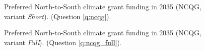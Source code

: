 \begin{figure}[h!]
    \caption[Preferred NCQG]{Preferred North-to-South climate grant funding in 2035 (NCQG, variant \textit{Short}). (Question \ref{q:ncqg}).
    }\label{fig:ncqg}
\end{figure}

\begin{figure}[h!]
    \caption[Preferred NCQG]{Preferred North-to-South climate grant funding in 2035 (NCQG, variant \textit{Full}). (Question \ref{q:ncqg_full}).
    }\label{fig:ncqg_full}
\end{figure}

